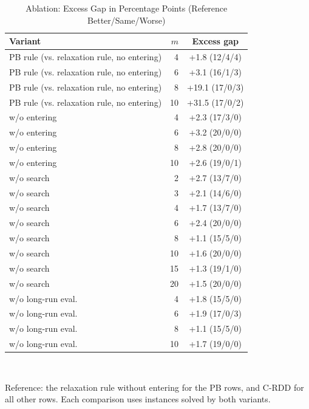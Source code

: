 \begin{table}[t]
  \centering
  \caption{Ablation: Excess Gap in Percentage Points (Reference Better/Same/Worse)}
  \label{tab:ablation}
  \footnotesize
  \begin{tabular}{@{}lrc@{}}
    \toprule
    Variant & $m$ & Excess gap \\
    \midrule
PB rule (vs. relaxation rule, no entering) & 4 & +1.8 (12/4/4) \\
PB rule (vs. relaxation rule, no entering) & 6 & +3.1 (16/1/3) \\
PB rule (vs. relaxation rule, no entering) & 8 & +19.1 (17/0/3) \\
PB rule (vs. relaxation rule, no entering) & 10 & +31.5 (17/0/2) \\
\midrule
w/o entering & 4 & +2.3 (17/3/0) \\
w/o entering & 6 & +3.2 (20/0/0) \\
w/o entering & 8 & +2.8 (20/0/0) \\
w/o entering & 10 & +2.6 (19/0/1) \\
\midrule
w/o search & 2 & +2.7 (13/7/0) \\
w/o search & 3 & +2.1 (14/6/0) \\
w/o search & 4 & +1.7 (13/7/0) \\
w/o search & 6 & +2.4 (20/0/0) \\
w/o search & 8 & +1.1 (15/5/0) \\
w/o search & 10 & +1.6 (20/0/0) \\
w/o search & 15 & +1.3 (19/1/0) \\
w/o search & 20 & +1.5 (20/0/0) \\
\midrule
w/o long-run eval. & 4 & +1.8 (15/5/0) \\
w/o long-run eval. & 6 & +1.9 (17/0/3) \\
w/o long-run eval. & 8 & +1.1 (15/5/0) \\
w/o long-run eval. & 10 & +1.7 (19/0/0) \\
    \bottomrule
  \end{tabular}
  \\[2pt]
  \parbox{\linewidth}{\scriptsize Reference: the relaxation rule without entering for the PB rows, and C-RDD for all other rows. Each comparison uses instances solved by both variants.}
\end{table}
